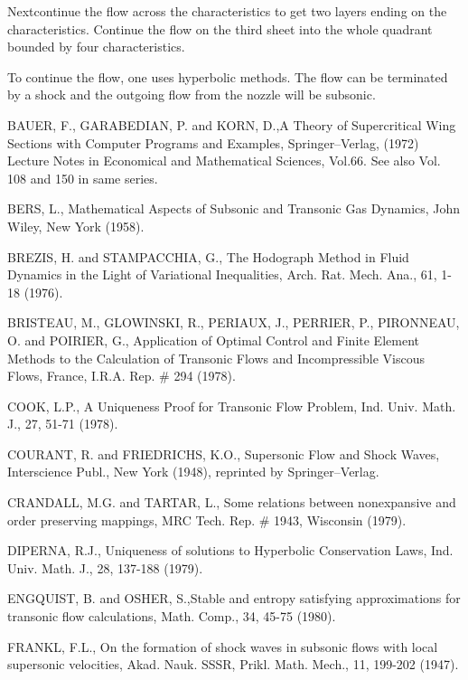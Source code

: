 Next\pageoriginale continue the flow across the characteristics to get two layers ending on the characteristics. Continue the flow on the third sheet into the whole quadrant bounded by four characteristics.

To continue the flow, one uses hyperbolic methods. The flow can be terminated by a shock and the outgoing flow from the nozzle will be subsonic.


\begin{thebibliography}{99}
 BAUER, F., GARABEDIAN, P. and KORN, D.,\pageoriginale A Theory of Supercritical Wing Sections with Computer Programs and Examples, Springer--Verlag, (1972) Lecture Notes in Economical and Mathematical Sciences, Vol.66. See also Vol. 108 and 150 in same series. 


 BERS, L., Mathematical Aspects of Subsonic and Transonic Gas Dynamics, John Wiley, New York (1958).

 BREZIS, H. and STAMPACCHIA, G., The Hodograph Method in Fluid Dynamics in the Light of Variational Inequalities, Arch. Rat. Mech. Ana., 61, 1-18 (1976). 

 BRISTEAU, M., GLOWINSKI, R., PERIAUX, J., PERRIER, P., PIRONNEAU, O. and POIRIER, G., Application of Optimal  Control and Finite Element Methods to the Calculation of Transonic Flows and Incompressible Viscous Flows, France, I.R.A. Rep. \# 294 (1978).

 COOK, L.P., A Uniqueness Proof for Transonic Flow Problem, Ind. Univ. Math. J., 27, 51-71 (1978).

 COURANT, R. and FRIEDRICHS, K.O., Supersonic Flow and Shock Waves, Interscience Publ., New York (1948), reprinted by Springer--Verlag.

 CRANDALL, M.G. and TARTAR, L., Some relations between nonexpansive and order preserving mappings, MRC Tech. Rep. \# 1943, Wisconsin (1979).

 DIPERNA, R.J., Uniqueness of solutions to Hyperbolic Conservation Laws, Ind. Univ. Math. J., 28, 137-188 (1979).
 
 ENGQUIST, B. and OSHER, S.,\pageoriginale Stable and entropy satisfying  approximations for transonic flow calculations, Math. Comp., 34, 45-75 (1980).

 FRANKL, F.L., On the formation of shock waves in subsonic flows with local supersonic velocities, Akad. Nauk. SSSR, Prikl. Math. Mech., 11, 199-202 (1947).


\end{thebibliography}
